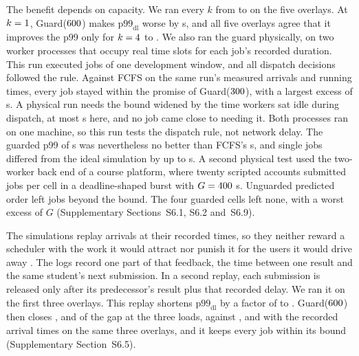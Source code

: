 The benefit depends on capacity. We ran every $k$ from  to  on the five
overlays. At $k = 1$, Guard($600$) makes $\mathrm{p99}_{\mathrm{dl}}$ worse
by  s, and all five overlays agree that it improves the p99 only for $k =
4$ to . We also ran the guard physically, on two worker processes that
occupy real time slots for each job's recorded duration. This run executed
 jobs of one development window, and all  dispatch decisions
followed the rule. Against FCFS on the same run's measured arrivals and running times, every
job stayed within the promise of Guard($300$), with a largest excess of
 s. A physical run needs the bound widened by the time workers sat idle
during dispatch, at most  s here, and no job came close to needing it. Both processes ran on one machine, so this run tests the dispatch
rule, not network delay. The guarded p99 of  s was nevertheless no better than
FCFS's  s, and single jobs differed from the ideal simulation by up to
 s. A second physical test used the two-worker back end of a course
platform, where twenty scripted accounts submitted  jobs per cell in a
deadline-shaped burst with $G = 400$ s. Unguarded predicted order left 
jobs beyond the bound. The four guarded cells left none, with a worst excess of
$G$ (Supplementary Sections~S6.1, S6.2 and~S6.9).

The simulations replay arrivals at their recorded times, so they neither reward a scheduler
with the work it would attract nor punish it for the users it would drive away
\cite{feitelson2021resampling,shmueli2009simulation}. The logs record one part of that
feedback, the time between one result and the same student's next submission. In a second
replay, each submission is released only after its predecessor's result plus that recorded
delay. We ran it on the first three overlays. This replay shortens
$\mathrm{p99}_{\mathrm{dl}}$ by a factor of  to .
Guard($600$) then closes ,  and  of the
gap at the three loads, against ,  and  with the
recorded arrival times on the same three overlays, and it keeps every job within its bound
(Supplementary Section~S6.5).
